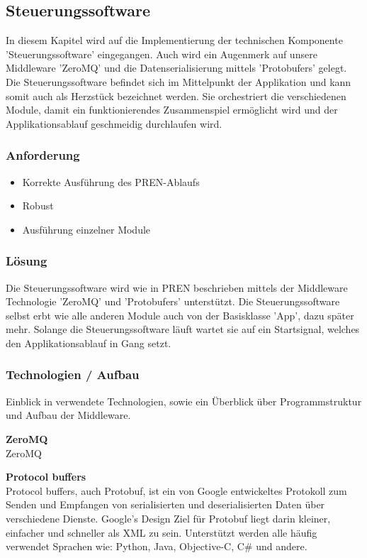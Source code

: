 \documentclass[../../main.tex]{subfiles}
\begin{document}
\subsection{Steuerungssoftware} \label{it_steuerungssoftware}
In diesem Kapitel wird auf die Implementierung der technischen Komponente 'Steuerungssoftware' eingegangen. Auch wird ein Augenmerk auf unsere Middleware 'ZeroMQ' und die Datenserialisierung mittels 'Protobufers' gelegt. Die Steuerungssoftware befindet sich im Mittelpunkt der Applikation und kann somit auch als Herzstück bezeichnet werden. Sie orchestriert die verschiedenen Module, damit ein funktionierendes Zusammenspiel ermöglicht wird und der Applikationsablauf geschmeidig durchlaufen wird.

\subsubsection{Anforderung}

\begin{itemize}
    \item Korrekte Ausführung des PREN-Ablaufs
    \item Robust
    \item Ausführung einzelner Module
\end{itemize}

\subsubsection{Lösung}
Die Steuerungssoftware wird wie in PREN beschrieben mittels der Middleware Technologie 'ZeroMQ' und 'Protobufers' unterstützt. Die Steuerungssoftware selbst erbt wie alle anderen Module auch von der Basisklasse 'App', dazu später mehr. Solange die Steuerungssoftware läuft wartet sie auf ein Startsignal, welches den Applikationsablauf in Gang setzt.

\subsubsection{Technologien / Aufbau}
Einblick in verwendete Technologien, sowie ein Überblick über Programmstruktur und Aufbau der Middleware. 

\textbf{ZeroMQ} \\
ZeroMQ %

\textbf{Protocol buffers} \\
Protocol buffers, auch Protobuf, ist ein von Google entwickeltes Protokoll zum Senden und Empfangen von serialisierten und deserialisierten Daten über verschiedene Dienste. Google's Design Ziel für Protobuf liegt darin kleiner, einfacher und schneller als XML zu sein. Unterstützt werden alle häufig verwendet Sprachen wie: Python, Java, Objective-C, C\# und andere.
\end{document}
